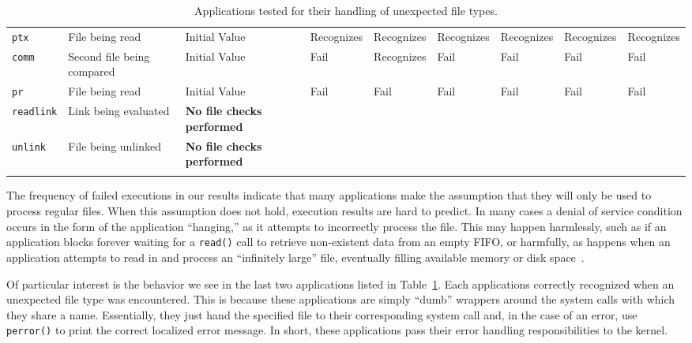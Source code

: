 \begin{table}[t]
\begin{tabular}{l  l  |  l  l  l  l  l  l  l}
        {\tt ptx}         & File being read            & Initial Value  & Recognizes     & Recognizes  & Recognizes & Recognizes  & Recognizes & Recognizes\\
        {\tt comm}        & Second file being compared & Initial Value  & Fail           & Recognizes  & Fail       & Fail        & Fail       & Fail\\
        {\tt pr}          & File being read            & Initial Value  & Fail           & Fail        & Fail       & Fail        & Fail       & Fail\\
\hline
        {\tt readlink}    & Link being evaluated       & \textbf{No file checks performed} & & & & & & \\
        {\tt unlink}      & File being unlinked        & \textbf{No file checks performed} & & & & & & \\
    \bottomrule{}
    \end{tabular}
    \caption{Applications tested for their handling of unexpected file types.}
    \label{table:unexpectedtypes}
\end{table}

The frequency of failed executions in our results indicate that many
applications make the assumption that they will only be used to process
regular files.  When this assumption does not hold, execution results
are hard to predict.  In many cases a denial of
service condition occurs in the form of the application ``hanging,'' as it
attempts to incorrectly process the file.  This may happen harmlessly, such
as if an application blocks forever waiting for a {\tt read()}
call to retrieve non-existent data from an empty FIFO, or harmfully, as
happens when an application attempts to read in and process an
``infinitely large'' file, eventually filling available memory or disk
space~\cite{Cappos_CCS_08}.

Of particular interest is the behavior we see in the last two applications
listed in Table~\ref{table:unexpectedtypes}.  Each applications correctly
recognized when an unexpected file type was encountered.  This is because
these applications are simply ``dumb'' wrappers around the system calls
with which they share a name. Essentially, they just hand the specified
file to their corresponding system call and, in the case of an error, use
{\tt perror()} to print the correct localized error message.  In short,
these applications pass their error handling responsibilities to the
kernel.

